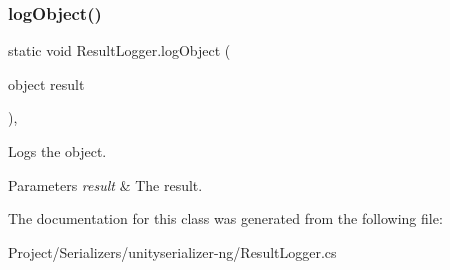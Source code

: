 \subsubsection{\texorpdfstring{log\+Object()}{logObject()}}
{\footnotesize\ttfamily static void Result\+Logger.\+log\+Object (\begin{DoxyParamCaption}\item[{object}]{result }\end{DoxyParamCaption})\hspace{0.3cm}{\ttfamily [inline]}, {\ttfamily [static]}}



Logs the object. 


\begin{DoxyParams}{Parameters}
{\em result} & The result.\\
\hline
\end{DoxyParams}


The documentation for this class was generated from the following file\+:\begin{DoxyCompactItemize}
\item 
Project/\+Serializers/unityserializer-\/ng/Result\+Logger.\+cs\end{DoxyCompactItemize}
